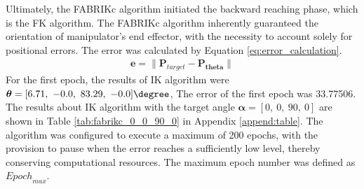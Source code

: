 Ultimately, the FABRIKc algorithm initiated the backward reaching phase, which is the FK algorithm. The 
FABRIKc algorithm inherently guaranteed the orientation of manipulator's end effector,  with the necessity to account 
solely for positional errors. The error was calculated by Equation \ref{eq:error_calculation}.
\begin{align}
    \textbf{e} = \lVert\textbf{P}_{target} - \textbf{P}_{\boldsymbol{theta}}\rVert
    \label{eq:error_calculation}
\end{align}
For the first epoch, the results of IK algorithm were
$\boldsymbol{\theta} = [6.71,\ -0.0,\ 83.29,\ -0.0]\degree $, 
The error of the first epoch was 33.77506. The results about IK algorithm with the target angle 
$\boldsymbol{\alpha} = [0,\ 0,\ 90,\ 0] $ are shown in Table \ref{tab:fabrikc_0_0_90_0} 
in Appendix \ref{append:table}. The algorithm was configured to execute a maximum of 200 epochs, with 
the provision to pause when the error reaches a sufficiently low level, thereby conserving computational resources. 
The maximum epoch number was defined as ${Epoch}_{max}$.
